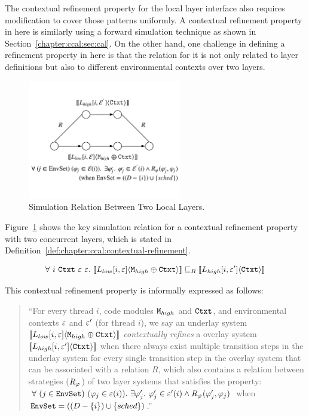 The contextual refinement property for the local layer interface also requires modification to cover those patterns uniformly. 
A contextual refinement property in here is similarly using a forward simulation technique as shown in  
Section~\ref{chapter:ccal:sec:cal}.
On the other hand, one challenge in defining a refinement property in here is that the relation for it is not only related to layer definitions but also to different environmental contexts over two layers. 
\begin{figure}
\begin{center}
\includegraphics[width=0.6\textwidth]{figs/ccal/locallayerrefinement}
\end{center}
\caption{Simulation Relation Between Two Local Layers.}
\label{fig:chapter:ccal:refinement-between-two-layers}
\end{figure}
Figure~\ref{fig:chapter:ccal:refinement-between-two-layers} shows the key simulation relation for 
a contextual refinement property with two concurrent layers, which is stated  in Definition~\ref{def:chapter:ccal:contextual-refinement}.
\begin{definition}
\label{def:chapter:ccal:contextual-refinement}
$$
\forall \ i\  \codeinmath{Ctxt} \ \oracle \ \oracle .\ \sem{L_{low}[i, \oracle]}{\codeinmath{M}_{high} \oplus \codeinmath{Ctxt}} \refines_R \sem{L_{high}[i, \oracle']}{\codeinmath{Ctxt}}
$$
\end{definition}
This contextual refinement property is informally expressed as follows:
\begin{quote}
``For every thread $i$,  code modules ${\mathrm{\texttt{M}}}_{high}$ and  ${\mathrm{\texttt{Ctxt}}}$,  and environmental contexts
  ${\varepsilon}$ and ${\varepsilon}'$ (for thread $i$), we say an underlay system   $[\![{L_{low}[i, {\varepsilon}]} \langle {{\mathrm{\texttt{M}}}_{high} \oplus {\mathrm{\texttt{Ctxt}}}} \rangle]\!]$
     \textit{contextually
 refines} a overlay system $ [\![{L_{high}[i, {\varepsilon}']} \langle {{\mathrm{\texttt{Ctxt}}}} \rangle]\!]$ when there always exist 
 multiple  transition steps in the underlay system for every  single  transition step
  in the overlay system that can be associated with a relation $R$,
which also contains a relation between strategies ($R_{\varphi_{}}$)
 of two layer systems that satisfies the property:
$\forall\ (j \in \codeinmath{EnvSet})\ 
(\strat{j} \in \oracle(i)) .\ \exists \stratp{j} . \ \stratp{j} \in \oracle'(i) \wedge R_{\strat{}}(\stratp{j}, \strat{j})$ when 
${\mathrm{\texttt{EnvSet}}} = ((D - \{ i\}) \cup \{ sched\})$.''
\end{quote}

